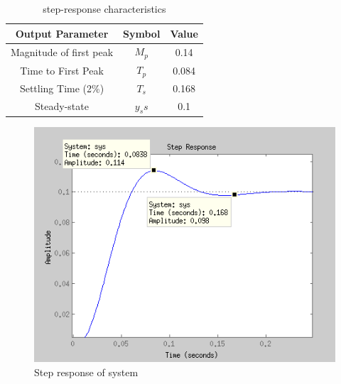 \documentclass{article}
\begin{document}
\begin{table}[!htbp]
\centering
    \begin{tabular}{|c|c|c|}
        \hline
        \textbf{Output Parameter} & \textbf{Symbol} & \textbf{Value} \\
        \hline
        Magnitude of first peak & $M_p$ & 0.14\\
        \hline
        Time to First Peak & $T_p$ & 0.084\\
        \hline
        Settling Time (2\%) & $T_s$ & 0.168\\
        \hline
        Steady-state & $y_ss$ & 0.1\\
        \hline
    \end{tabular}
    \caption{step-response characteristics}
\end{table}

\begin{figure}[!htbp]
\centering
\includegraphics[width=6.5in]{prelab-2vStepResponse.png}
\caption{Step response of system}
\end{figure}

\end{document}
